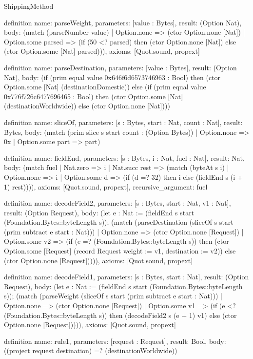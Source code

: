 \begin{lexlean}{ShippingMethod}
\begin{semanticmodule}
definition{
  name: parseWeight,
  parameters: [value : Bytes],
  result: (Option Nat),
  body: (match (parseNumber value)
    | Option.none => (ctor Option.none [Nat])
    | Option.some parsed => (if (50 <? parsed) then (ctor Option.none [Nat]) else (ctor Option.some [Nat] parsed))),
  axioms: [Quot.sound, propext]
}

definition{
  name: parseDestination,
  parameters: [value : Bytes],
  result: (Option Nat),
  body: (if (prim equal value 0x646f6d6573746963 : Bool) then (ctor Option.some [Nat] (destinationDomestic)) else (if (prim equal value 0x776f726c6477696465 : Bool) then (ctor Option.some [Nat] (destinationWorldwide)) else (ctor Option.none [Nat])))
}

definition{
  name: sliceOf,
  parameters: [s : Bytes, start : Nat, count : Nat],
  result: Bytes,
  body: (match (prim slice s start count : (Option Bytes))
    | Option.none => 0x
    | Option.some part => part)
}

definition{
  name: fieldEnd,
  parameters: [s : Bytes, i : Nat, fuel : Nat],
  result: Nat,
  body: (match fuel
    | Nat.zero => i
    | Nat.succ rest => (match (byteAt s i)
      | Option.none => i
      | Option.some d => (if (d =? 32) then i else (fieldEnd s (i + 1) rest)))),
  axioms: [Quot.sound, propext],
  recursive_argument: fuel
}

definition{
  name: decodeField2,
  parameters: [s : Bytes, start : Nat, v1 : Nat],
  result: (Option Request),
  body: (let e : Nat := (fieldEnd s start (Foundation.Bytes::byteLength s)); (match (parseDestination (sliceOf s start (prim subtract e start : Nat)))
    | Option.none => (ctor Option.none [Request])
    | Option.some v2 => (if (e =? (Foundation.Bytes::byteLength s)) then (ctor Option.some [Request] (record Request {weight := v1, destination := v2})) else (ctor Option.none [Request])))),
  axioms: [Quot.sound, propext]
}

definition{
  name: decodeField1,
  parameters: [s : Bytes, start : Nat],
  result: (Option Request),
  body: (let e : Nat := (fieldEnd s start (Foundation.Bytes::byteLength s)); (match (parseWeight (sliceOf s start (prim subtract e start : Nat)))
    | Option.none => (ctor Option.none [Request])
    | Option.some v1 => (if (e <? (Foundation.Bytes::byteLength s)) then (decodeField2 s (e + 1) v1) else (ctor Option.none [Request])))),
  axioms: [Quot.sound, propext]
}

definition{
  name: rule1,
  parameters: [request : Request],
  result: Bool,
  body: ((project request destination) =? (destinationWorldwide))
}


\end{semanticmodule}
\end{lexlean}
